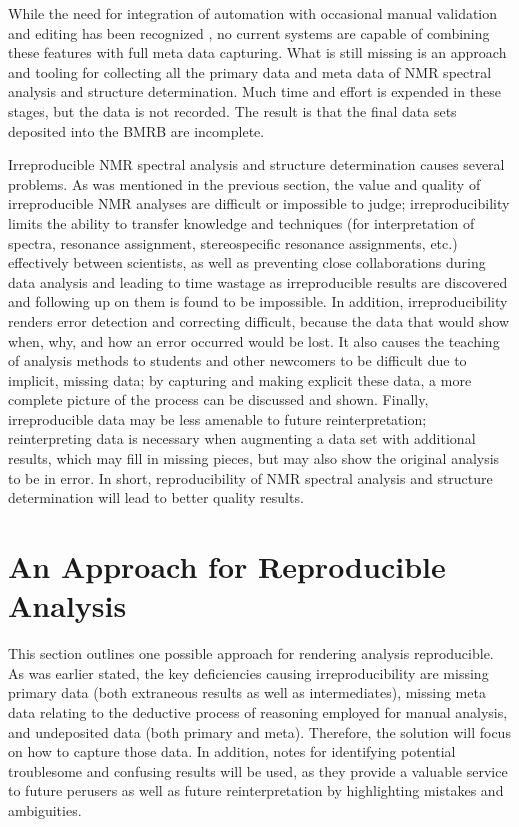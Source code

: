 While the need for integration of automation with occasional manual 
validation and editing has been recognized \cite{baran2006spins}, no 
current systems are capable of combining these features with full 
meta data capturing.  
What is still missing is an approach and tooling for collecting all the primary 
data and meta data of NMR spectral analysis and structure determination.  Much 
time and effort is expended in these stages, but the data is not recorded.  The 
result is that the final data sets deposited into the BMRB are incomplete.

Irreproducible NMR spectral analysis and structure determination causes 
several problems.  As was mentioned in the previous section, the value and 
quality of irreproducible NMR analyses are difficult or impossible to judge; 
irreproducibility limits the ability to transfer knowledge and techniques 
(for interpretation of spectra, resonance assignment, stereospecific resonance 
assignments, etc.) effectively between scientists, as well as preventing close 
collaborations during data analysis and leading to time wastage as 
irreproducible results are discovered and following up on them is found to be 
impossible.  In addition, irreproducibility renders error detection and 
correcting difficult, because the data that would show when, why, and how an 
error occurred would be lost.  It also causes the teaching of analysis methods 
to students and other newcomers to be difficult due to implicit, missing data; 
by capturing and making explicit these data, a more complete picture of the 
process can be discussed and shown.  Finally, irreproducible data may be less 
amenable to future reinterpretation; reinterpreting data is necessary when 
augmenting a data set with additional results, which may fill in missing 
pieces, but may also show the original analysis to be in error.  In short, 
reproducibility of NMR spectral analysis and structure determination will lead 
to better quality results.


\section{An Approach for Reproducible Analysis}
This section outlines one possible approach for rendering analysis reproducible.
As was earlier stated, the key deficiencies causing irreproducibility are 
missing primary data (both extraneous results as well as intermediates), 
missing meta data relating to the deductive process of reasoning employed 
for manual analysis, and undeposited data (both primary and meta).  Therefore, 
the solution will focus on how to capture those data.  In addition, notes for 
identifying potential troublesome and confusing results will be used, as they 
provide a valuable service to future perusers as well as future 
reinterpretation by highlighting mistakes and ambiguities.


